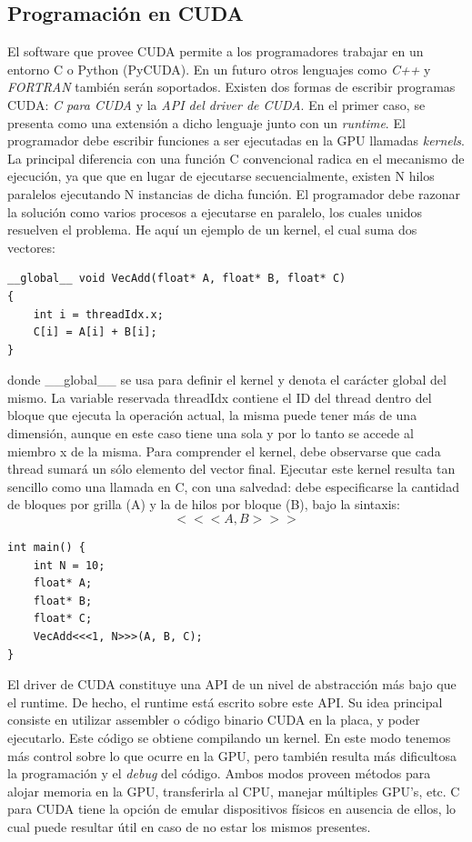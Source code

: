 \subsection{Programación en CUDA}
El software que provee CUDA permite a los programadores trabajar en un entorno C o Python (PyCUDA).
En un futuro otros lenguajes como {\em C++} y {\em FORTRAN} tambi\'en ser\'an soportados. 
Existen dos formas de escribir programas CUDA: {\em C para CUDA} y la {\em API del driver de CUDA}.
En el primer caso, se presenta como una extensi\'on a dicho lenguaje junto con un {\em runtime}.
El programador debe escribir funciones a ser ejecutadas en la GPU llamadas {\em kernels}. 
La principal diferencia con una funci\'on C convencional radica en el mecanismo de ejecución, ya que que en lugar de ejecutarse secuencialmente, existen N hilos paralelos ejecutando N instancias de dicha funci\'on. 
El programador debe razonar la solución como varios procesos a ejecutarse en paralelo, los cuales unidos resuelven el problema.
He aqu\'i un ejemplo de un kernel, el cual suma dos vectores:

\begin{verbatim}
__global__ void VecAdd(float* A, float* B, float* C)
{
    int i = threadIdx.x;
    C[i] = A[i] + B[i];
}
\end{verbatim}

\noindent donde \_\_global\_\_ se usa para definir el kernel y denota el car\'acter global del mismo.
La variable reservada threadIdx contiene el ID del thread dentro del bloque que ejecuta la operaci\'on actual, la misma puede tener m\'as de una dimensi\'on, aunque en este caso tiene una sola y por lo tanto se accede al miembro x de la misma.
Para comprender el kernel, debe observarse que cada thread sumar\'a un s\'olo elemento del vector final.
Ejecutar este kernel resulta tan sencillo como una llamada en C, con una salvedad: debe especificarse la cantidad de bloques por grilla (A) y la de hilos por bloque (B), bajo la sintaxis:
$$<<<A , B >>>$$

\begin{verbatim}
int main() {
    int N = 10;
    float* A;
    float* B;
    float* C;
    VecAdd<<<1, N>>>(A, B, C);
}

\end{verbatim}


El driver de CUDA constituye una API de un nivel de abstracci\'on m\'as bajo que el runtime.
De hecho, el runtime est\'a escrito sobre este API.
Su idea principal consiste en utilizar assembler o c\'odigo binario CUDA en la placa, y poder ejecutarlo.
Este c\'odigo se obtiene compilando un kernel.
En este modo tenemos m\'as control sobre lo que ocurre en la GPU, pero tambi\'en resulta m\'as dificultosa la programaci\'on y el {\em debug} del c\'odigo.
Ambos modos proveen m\'etodos para alojar memoria en la GPU, transferirla al CPU, manejar m\'ultiples GPU's, etc.
C para CUDA tiene la opci\'on de emular dispositivos f\'isicos en ausencia de ellos, lo cual puede resultar \'util en caso de no estar los mismos presentes.

